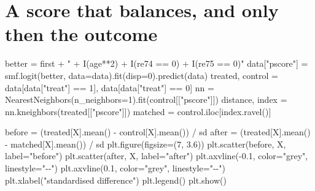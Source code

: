 \documentclass[
  letterpaper,
  10pt,
  twoside,
  openright,
  numbers=noenddot,
  chapterprefix=true]{scrbook}
\newenvironment{Shaded}{}{}
\newcommand{\DecValTok}[1]{\textcolor[rgb]{0.00,0.36,0.77}{#1}}
\newcommand{\FloatTok}[1]{\textcolor[rgb]{0.00,0.36,0.77}{#1}}
\newcommand{\NormalTok}[1]{\textcolor[rgb]{0.14,0.16,0.18}{#1}}
\newcommand{\OperatorTok}[1]{\textcolor[rgb]{0.14,0.16,0.18}{#1}}
\newcommand{\StringTok}[1]{\textcolor[rgb]{0.01,0.18,0.38}{#1}}
\begin{document}
\section{A score that balances, and only then the
outcome}\label{a-score-that-balances-and-only-then-the-outcome}

\begin{Shaded}
\begin{Highlighting}[]
\NormalTok{better }\OperatorTok{=}\NormalTok{ first }\OperatorTok{+} \StringTok{" + I(age**2) + I(re74 == 0) + I(re75 == 0)"}
\NormalTok{data[}\StringTok{"pscore"}\NormalTok{] }\OperatorTok{=}\NormalTok{ smf.logit(better, data}\OperatorTok{=}\NormalTok{data).fit(disp}\OperatorTok{=}\DecValTok{0}\NormalTok{).predict(data)}
\NormalTok{treated, control }\OperatorTok{=}\NormalTok{ data[data[}\StringTok{"treat"}\NormalTok{] }\OperatorTok{==} \DecValTok{1}\NormalTok{], data[data[}\StringTok{"treat"}\NormalTok{] }\OperatorTok{==} \DecValTok{0}\NormalTok{]}
\NormalTok{nn }\OperatorTok{=}\NormalTok{ NearestNeighbors(n\_neighbors}\OperatorTok{=}\DecValTok{1}\NormalTok{).fit(control[[}\StringTok{"pscore"}\NormalTok{]])}
\NormalTok{distance, index }\OperatorTok{=}\NormalTok{ nn.kneighbors(treated[[}\StringTok{"pscore"}\NormalTok{]])}
\NormalTok{matched }\OperatorTok{=}\NormalTok{ control.iloc[index.ravel()]}

\NormalTok{before }\OperatorTok{=}\NormalTok{ (treated[X].mean() }\OperatorTok{{-}}\NormalTok{ control[X].mean()) }\OperatorTok{/}\NormalTok{ sd}
\NormalTok{after }\OperatorTok{=}\NormalTok{ (treated[X].mean() }\OperatorTok{{-}}\NormalTok{ matched[X].mean()) }\OperatorTok{/}\NormalTok{ sd}
\NormalTok{plt.figure(figsize}\OperatorTok{=}\NormalTok{(}\DecValTok{7}\NormalTok{, }\FloatTok{3.6}\NormalTok{))}
\NormalTok{plt.scatter(before, X, label}\OperatorTok{=}\StringTok{"before"}\NormalTok{)}
\NormalTok{plt.scatter(after, X, label}\OperatorTok{=}\StringTok{"after"}\NormalTok{)}
\NormalTok{plt.axvline(}\OperatorTok{{-}}\FloatTok{0.1}\NormalTok{, color}\OperatorTok{=}\StringTok{"grey"}\NormalTok{, linestyle}\OperatorTok{=}\StringTok{"{-}{-}"}\NormalTok{)}
\NormalTok{plt.axvline(}\FloatTok{0.1}\NormalTok{, color}\OperatorTok{=}\StringTok{"grey"}\NormalTok{, linestyle}\OperatorTok{=}\StringTok{"{-}{-}"}\NormalTok{)}
\NormalTok{plt.xlabel(}\StringTok{"standardised difference"}\NormalTok{)}
\NormalTok{plt.legend()}
\NormalTok{plt.show()}


\end{Highlighting}
\end{Shaded}
\end{document}
